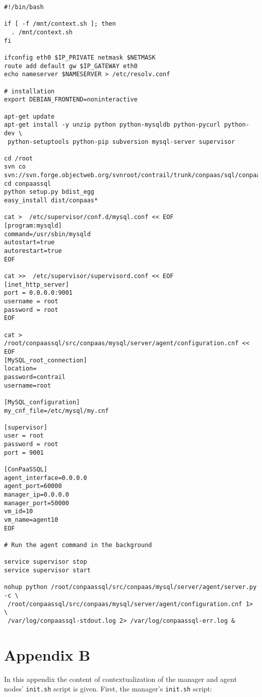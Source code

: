 \documentclass[a4paper,10pt]{article}
\begin{document}
\begin{Verbatim}[frame=single]
#!/bin/bash

if [ -f /mnt/context.sh ]; then
  . /mnt/context.sh
fi

ifconfig eth0 $IP_PRIVATE netmask $NETMASK
route add default gw $IP_GATEWAY eth0
echo nameserver $NAMESERVER > /etc/resolv.conf

# installation
export DEBIAN_FRONTEND=noninteractive

apt-get update
apt-get install -y unzip python python-mysqldb python-pycurl python-dev \
 python-setuptools python-pip subversion mysql-server supervisor

cd /root
svn co svn://svn.forge.objectweb.org/svnroot/contrail/trunk/conpaas/sql/conpaassql
cd conpaassql
python setup.py bdist_egg
easy_install dist/conpaas*

cat >  /etc/supervisor/conf.d/mysql.conf << EOF
[program:mysqld]
command=/usr/sbin/mysqld
autostart=true
autorestart=true
EOF

cat >>  /etc/supervisor/supervisord.conf << EOF
[inet_http_server]
port = 0.0.0.0:9001
username = root
password = root
EOF

cat >  /root/conpaassql/src/conpaas/mysql/server/agent/configuration.cnf << EOF
[MySQL_root_connection]
location=
password=contrail
username=root

[MySQL_configuration]
my_cnf_file=/etc/mysql/my.cnf

[supervisor]
user = root
password = root
port = 9001

[ConPaaSSQL]
agent_interface=0.0.0.0
agent_port=60000
manager_ip=0.0.0.0
manager_port=50000
vm_id=10
vm_name=agent10
EOF

# Run the agent command in the background

service supervisor stop
service supervisor start

nohup python /root/conpaassql/src/conpaas/mysql/server/agent/server.py -c \
 /root/conpaassql/src/conpaas/mysql/server/agent/configuration.cnf 1> \
 /var/log/conpaassql-stdout.log 2> /var/log/conpaassql-err.log &

\end{Verbatim}

\newpage

\section{Appendix B}
\label{app:init}

In this appendix the content of contextualization of the manager and agent nodes' {\tt init.sh} script is given. First, the manager's {\tt init.sh} script:
\end{document}
